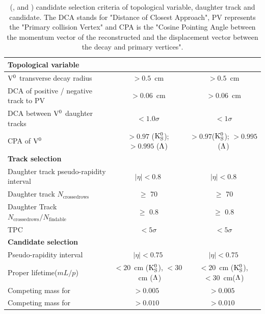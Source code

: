 \begin{table}[!ht]
	\begin{center}
		\caption{\Vzeros (\kzero, \lmb and \almb) candidate selection criteria of topological variable, daughter track and candidate. The DCA stands for "Distance of Closest Approach", PV represents the "Primary collision Vertex" and CPA is the "Cosine Pointing Angle between the momentum vector of the reconstructed \Vzero and the displacement vector between the decay and primary vertices".}
		\label{Tab:V0Cut}
		\begin{tabularx}{\textwidth}{@{} lCC @{}}
			\toprule
			\textbf{Topological variable} & \textbf{\pp} & \textbf{\pPb} \\
			\midrule
			${\rm V}^{0}$ transverse decay radius    & $> 0.5$~cm    & $> 0.5$~cm \\
			DCA of positive / negative track to PV         & $> 0.06$~cm                              & $> 0.06$~cm \\
			DCA between ${\rm V}^{0}$ daughter tracks & $< 1.0\sigma$                               & $< 1\sigma$ \\
			CPA of ${\rm V}^{0}$             & $> 0.97$ (${\rm K}^{0}_{\rm{S}}$); $>0.995$ ($\Lambda$)   & $> 0.97$(${\rm K}^{0}_{\rm{S}}$); $>0.995$ ($\Lambda$) \\
			\midrule
			\textbf{Track selection}    \\
			\midrule
			Daughter track pseudo-rapidity interval &$|\eta| < 0.8$  &$|\eta| < 0.8$  \\
			Daughter track $N_\mathrm{crossed rows}$  &$\geq$ 70   &$\geq$ 70 \\
			Daughter Track $N_\mathrm{crossed rows}/N_\mathrm{findable}$ &$\geq$ 0.8 &$\geq$ 0.8 \\
			TPC \dEdx & $< 5\sigma$   & $< 5\sigma$\\
			\midrule
			\textbf{Candidate selection}\\
			\midrule
			Pseudo-rapidity interval	& $|\eta| < 0.75$   &	$|\eta| < 0.75$   \\	
			Proper lifetime($mL/p$)       & $< 20$~cm (${\rm K}^{0}_{\rm{S}}$), $< 30$~cm ($\Lambda$) & $<20$~cm (${\rm K}^{0}_{\rm{S}}$), $< 30$~cm($\Lambda$) \\
			Competing mass for \kzero & $> 0.005$~\GeVmass & $> 0.005$~\GeVmass \\
			Competing mass for \lmb   & $> 0.010$~\GeVmass & $> 0.010$~\GeVmass \\
			\bottomrule
		\end{tabularx}
	\end{center}
\end{table}

